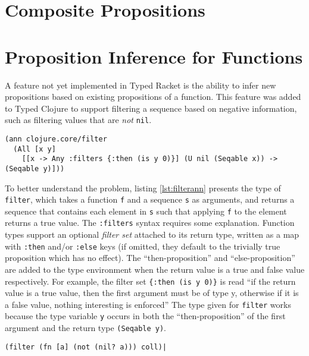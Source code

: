\section{Composite Propositions}


\section{Proposition Inference for Functions}
\label{sec:filterneg}

A feature not yet implemented in Typed Racket is the ability
to infer new propositions based on existing propositions of a function.
This feature was added to Typed Clojure to support filtering
a sequence based on negative information, such as filtering values
that are \emph{not} \lstinline|nil|.

\begin{lstlisting}[caption=Type annotation for filter, label=lst:filterann]
(ann clojure.core/filter 
  (All [x y]
    [[x -> Any :filters {:then (is y 0)}] (U nil (Seqable x)) -> (Seqable y)]))
\end{lstlisting}

To better understand the problem, listing \ref{lst:filterann} presents the type of \lstinline|filter|,
which takes a function \lstinline|f| and a sequence \lstinline|s| as arguments, and returns a sequence that 
contains each element in \lstinline|s| such that applying \lstinline|f| to the element returns a true value.
The \lstinline|:filters| syntax requires some explanation. 
Function types support an optional \emph{filter set} attached to its return type, written as a map
with \lstinline|:then| and/or \lstinline|:else| keys (if omitted, they default to the trivially true proposition which has no effect). 
The ``then-proposition'' and ``else-proposition'' are added
to the type environment when the return value is a true and false value respectively.
For example, the filter set \lstinline|{:then (is y 0)}| is read ``if the return value is a true value, then the first argument
must be of type y, otherwise if it is a false value, nothing interesting is enforced''
The type given for \lstinline|filter| works because the type variable
\lstinline|y| occurs in both the ``then-proposition'' of the first argument and the return type 
\lstinline|(Seqable y)|.

\begin{lstlisting}[caption=Troublesome filter, label=lst:filtertrouble]
(filter (fn [a] (not (nil? a))) coll)|
\end{lstlisting}

